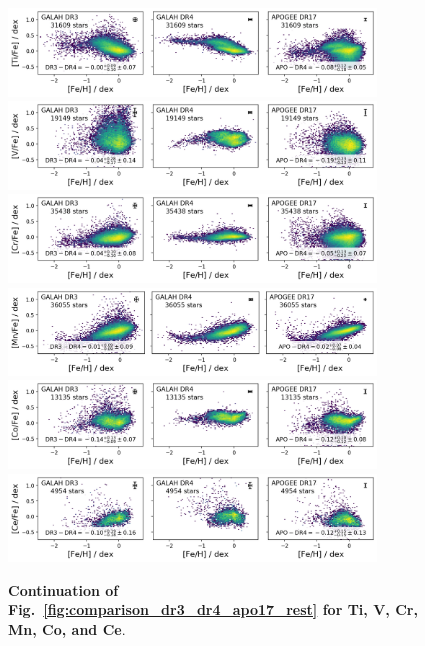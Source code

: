\documentclass[
  journal=pasa,
  manuscript=research-paper, %
  year=2024,
  volume=37
]{cup-journal}
\begin{document}
\begin{figure}[ht]
 \centering
 \includegraphics[width=0.87\textwidth]{figures/comparison_dr4_dr3_apo17_Ti_fe.png}
 \includegraphics[width=0.87\textwidth]{figures/comparison_dr4_dr3_apo17_V_fe.png}
 \includegraphics[width=0.87\textwidth]{figures/comparison_dr4_dr3_apo17_Cr_fe.png}
 \includegraphics[width=0.87\textwidth]{figures/comparison_dr4_dr3_apo17_Mn_fe.png}
 \includegraphics[width=0.87\textwidth]{figures/comparison_dr4_dr3_apo17_Co_fe.png}
 \includegraphics[width=0.87\textwidth]{figures/comparison_dr4_dr3_apo17_Ce_fe.png}
 \caption{\textbf{Continuation of Fig.~\ref{fig:comparison_dr3_dr4_apo17_rest} for Ti, V, Cr, Mn, Co, and Ce}.}
 \label{fig:comparison_dr3_dr4_apo17_rest2}
\end{figure}
\end{document}
